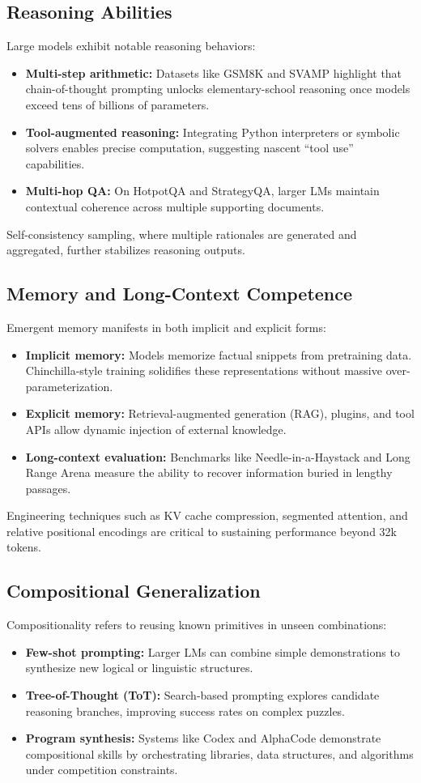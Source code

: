 \documentclass{article}
\begin{document}
\subsection{Reasoning Abilities}
Large models exhibit notable reasoning behaviors:
\begin{itemize}
  \item \textbf{Multi-step arithmetic:} Datasets like GSM8K and SVAMP highlight that chain-of-thought prompting unlocks elementary-school reasoning once models exceed tens of billions of parameters.
  \item \textbf{Tool-augmented reasoning:} Integrating Python interpreters or symbolic solvers enables precise computation, suggesting nascent ``tool use'' capabilities.
  \item \textbf{Multi-hop QA:} On HotpotQA and StrategyQA, larger LMs maintain contextual coherence across multiple supporting documents.
\end{itemize}
Self-consistency sampling, where multiple rationales are generated and aggregated, further stabilizes reasoning outputs.

\subsection{Memory and Long-Context Competence}
Emergent memory manifests in both implicit and explicit forms:
\begin{itemize}
  \item \textbf{Implicit memory:} Models memorize factual snippets from pretraining data. Chinchilla-style training solidifies these representations without massive over-parameterization.
  \item \textbf{Explicit memory:} Retrieval-augmented generation (RAG), plugins, and tool APIs allow dynamic injection of external knowledge.
  \item \textbf{Long-context evaluation:} Benchmarks like Needle-in-a-Haystack and Long Range Arena measure the ability to recover information buried in lengthy passages.
\end{itemize}
Engineering techniques such as KV cache compression, segmented attention, and relative positional encodings are critical to sustaining performance beyond 32k tokens.

\subsection{Compositional Generalization}
Compositionality refers to reusing known primitives in unseen combinations:
\begin{itemize}
  \item \textbf{Few-shot prompting:} Larger LMs can combine simple demonstrations to synthesize new logical or linguistic structures.
  \item \textbf{Tree-of-Thought (ToT):} Search-based prompting explores candidate reasoning branches, improving success rates on complex puzzles.
  \item \textbf{Program synthesis:} Systems like Codex and AlphaCode demonstrate compositional skills by orchestrating libraries, data structures, and algorithms under competition constraints.
\end{itemize}
\end{document}
